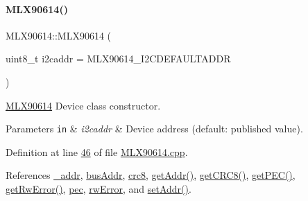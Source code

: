 \paragraph{\texorpdfstring{M\+L\+X90614()}{MLX90614()}}
{\footnotesize\ttfamily M\+L\+X90614\+::\+M\+L\+X90614 (\begin{DoxyParamCaption}\item[{uint8\+\_\+t}]{i2caddr = {\ttfamily MLX90614\+\_\+I2CDEFAULTADDR} }\end{DoxyParamCaption})}



\mbox{\hyperlink{class_m_l_x90614}{M\+L\+X90614}} Device class constructor. 


\begin{DoxyParams}[1]{Parameters}
\mbox{\tt in}  & {\em i2caddr} & Device address (default\+: published value). \\
\hline
\end{DoxyParams}


Definition at line \mbox{\hyperlink{_m_l_x90614_8cpp_source_l00046}{46}} of file \mbox{\hyperlink{_m_l_x90614_8cpp_source}{M\+L\+X90614.\+cpp}}.



References \mbox{\hyperlink{_m_l_x90614_8h_source_l00145}{\+\_\+addr}}, \mbox{\hyperlink{_m_l_x90614_8h_source_l00123}{bus\+Addr}}, \mbox{\hyperlink{_m_l_x90614_8h_source_l00125}{crc8}}, \mbox{\hyperlink{_m_l_x90614_8cpp_source_l00250}{get\+Addr()}}, \mbox{\hyperlink{_m_l_x90614_8h_source_l00154}{get\+C\+R\+C8()}}, \mbox{\hyperlink{_m_l_x90614_8h_source_l00155}{get\+P\+E\+C()}}, \mbox{\hyperlink{_m_l_x90614_8h_source_l00153}{get\+Rw\+Error()}}, \mbox{\hyperlink{_m_l_x90614_8h_source_l00126}{pec}}, \mbox{\hyperlink{_m_l_x90614_8h_source_l00124}{rw\+Error}}, and \mbox{\hyperlink{_m_l_x90614_8cpp_source_l00226}{set\+Addr()}}.


